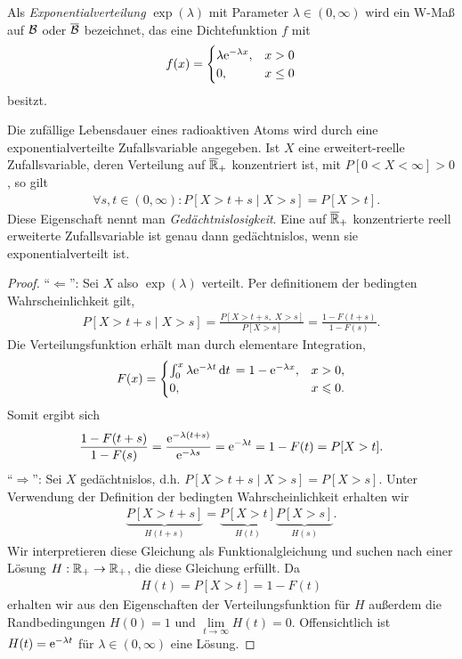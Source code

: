 \begin{bem}
\label{bem:6.5}
Als \emph{Exponentialverteilung} $\exp (\lambda )$ mit
Parameter $\lambda \in (0,\infty)$ wird ein W-Maß auf ${\mathcal{B}}$ oder
$\overline{\mathcal{B}}$
bezeichnet, das eine Dichtefunktion $f$ mit
\begin{align*}
f(x)= \begin{cases}
\lambda \mathrm{e}^ {-\lambda x}, &  x>0     \\
0,                       & x\leq 0
\end{cases}
\end{align*}
besitzt.

Die zufällige Lebensdauer eines radioaktiven Atoms wird durch eine
exponentialverteilte Zufallsvariable angegeben. Ist $X$ eine erweitert-reelle
Zufallsvariable, deren Verteilung auf $\overline{\mathbb{R}}_{+}$ konzentriert ist,
mit $P[0<X<\infty]>0$, so gilt
\begin{align*}
&\forall s, t\in (0,\infty) :
 P[X>t+s \mid X>s] =P[X>t].
\end{align*}
Diese Eigenschaft nennt man \emph{Gedächtnislosigkeit}. Eine auf
$\overline{\mathbb{R}}_{+}$ konzentrierte reell erweiterte Zufallsvariable ist genau
dann gedächtnislos, wenn sie exponentialverteilt ist.
\begin{proof}
``$\Leftarrow$'': Sei $X$ also $\exp(\lambda)$ verteilt. Per definitionem der
bedingten Wahrscheinlichkeit gilt,
\begin{align*}
P[X>t+s\mid X>s] = \frac{P[X>t+s,\;X>s]}{P[X>s]}
= \frac{1-F(t+s)}{1-F(s)}. 
\end{align*}
Die Verteilungsfunktion erhält man durch elementare Integration,
\begin{align*}
F(x) = 
\begin{cases}
\int_0^x \lambda \mathrm{e}^{-\lambda t}\,\mathrm{d} t\, = 1-\mathrm{e}^{-\lambda x}, & x > 0,\\
0, & x\leqslant 0.
\end{cases}
\end{align*}
Somit ergibt sich
\begin{align*}
\frac{1-F(t+s)}{1-F(s)} = \frac{\mathrm{e}^{-\lambda (t+s)}}{\mathrm{e}^{-\lambda s}} =
\mathrm{e}^{-\lambda t} = 1- F(t) = P[X>t].
\end{align*}
``$\Rightarrow$'': Sei $X$ gedächtnislos, d.h. $P[X>t+s\mid X>s]=P[X>s]$. Unter
Verwendung der Definition der bedingten Wahrscheinlichkeit erhalten wir
\begin{align*}
\underbrace{P[X>t+s]}_{H(t+s)} =
\underbrace{P[X>t]}_{H(t)}\underbrace{P[X>s]}_{H(s)}.
\end{align*}
Wir interpretieren diese Gleichung als Funktionalgleichung und suchen nach
einer Lösung $H:\mathbb{R}_+\to\mathbb{R}_+$, die diese Gleichung erfüllt. Da
\begin{align*}
H(t)=P[X>t]=1-F(t)
\end{align*}
erhalten wir aus den Eigenschaften der Verteilungsfunktion
für $H$ außerdem die Randbedingungen $H(0)=1$ und
$\lim\limits_{t\to\infty}H(t) = 0$. Offensichtlich ist $H(t)=\mathrm{e}^{-\lambda t}$
für $\lambda\in(0,\infty)$ eine Lösung.


\end{proof}
\end{bem}
